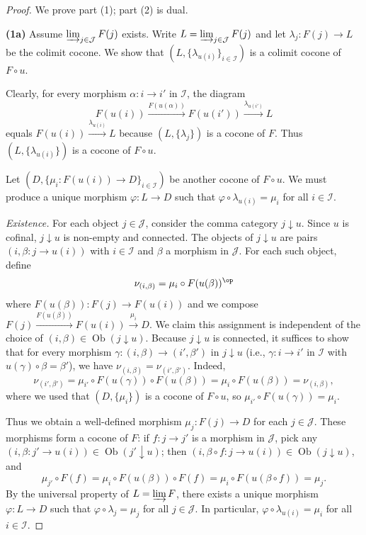 \begin{proof}
We prove part (1); part (2) is dual.

\textbf{(1a)} Assume $\varinjlim_{j \in \mathcal{J}} F(j)$ exists. Write $L = \varinjlim_{j \in \mathcal{J}} F(j)$ and let $\lambda_j : F(j) \to L$ be the colimit cocone. We show that $(L, \{\lambda_{u(i)}\}_{i \in \mathcal{I}})$ is a colimit cocone of $F \circ u$.

Clearly, for every morphism $\alpha : i \to i'$ in $\mathcal{I}$, the diagram
$$F(u(i)) \xrightarrow{F(u(\alpha))} F(u(i')) \xrightarrow{\lambda_{u(i')}} L$$
equals $F(u(i)) \xrightarrow{\lambda_{u(i)}} L$ because $(L, \{\lambda_j\})$ is a cocone of $F$. Thus $(L, \{\lambda_{u(i)}\})$ is a cocone of $F \circ u$.

Let $(D, \{\mu_i : F(u(i)) \to D\}_{i \in \mathcal{I}})$ be another cocone of $F \circ u$. We must produce a unique morphism $\varphi : L \to D$ such that $\varphi \circ \lambda_{u(i)} = \mu_i$ for all $i \in \mathcal{I}$.

\textit{Existence.} For each object $j \in \mathcal{J}$, consider the comma category $j \downarrow u$. Since $u$ is cofinal, $j \downarrow u$ is non-empty and connected. The objects of $j \downarrow u$ are pairs $(i, \beta : j \to u(i))$ with $i \in \mathcal{I}$ and $\beta$ a morphism in $\mathcal{J}$. For each such object, define
$$\nu_{(i,\beta)} = \mu_i \circ F(u(\beta))^{\op}$$
where $F(u(\beta)) : F(j) \to F(u(i))$ and we compose $F(j) \xrightarrow{F(u(\beta))} F(u(i)) \xrightarrow{\mu_i} D$. We claim this assignment is independent of the choice of $(i,\beta) \in \operatorname{Ob}(j \downarrow u)$. Because $j \downarrow u$ is connected, it suffices to show that for every morphism $\gamma : (i,\beta) \to (i',\beta')$ in $j \downarrow u$ (i.e., $\gamma : i \to i'$ in $\mathcal{I}$ with $u(\gamma) \circ \beta = \beta'$), we have $\nu_{(i,\beta)} = \nu_{(i',\beta')}$. Indeed,
$$\nu_{(i',\beta')} = \mu_{i'} \circ F(u(\gamma)) \circ F(u(\beta)) = \mu_i \circ F(u(\beta)) = \nu_{(i,\beta)},$$
where we used that $(D, \{\mu_i\})$ is a cocone of $F \circ u$, so $\mu_{i'} \circ F(u(\gamma)) = \mu_i$.

Thus we obtain a well-defined morphism $\mu_j : F(j) \to D$ for each $j \in \mathcal{J}$. These morphisms form a cocone of $F$: if $f : j \to j'$ is a morphism in $\mathcal{J}$, pick any $(i,\beta : j' \to u(i)) \in \operatorname{Ob}(j' \downarrow u)$; then $(i, \beta \circ f : j \to u(i)) \in \operatorname{Ob}(j \downarrow u)$, and
$$\mu_{j'} \circ F(f) = \mu_i \circ F(u(\beta)) \circ F(f) = \mu_i \circ F(u(\beta \circ f)) = \mu_j.$$
By the universal property of $L = \varinjlim F$, there exists a unique morphism $\varphi : L \to D$ such that $\varphi \circ \lambda_j = \mu_j$ for all $j \in \mathcal{J}$. In particular, $\varphi \circ \lambda_{u(i)} = \mu_i$ for all $i \in \mathcal{I}$.


\end{proof}
